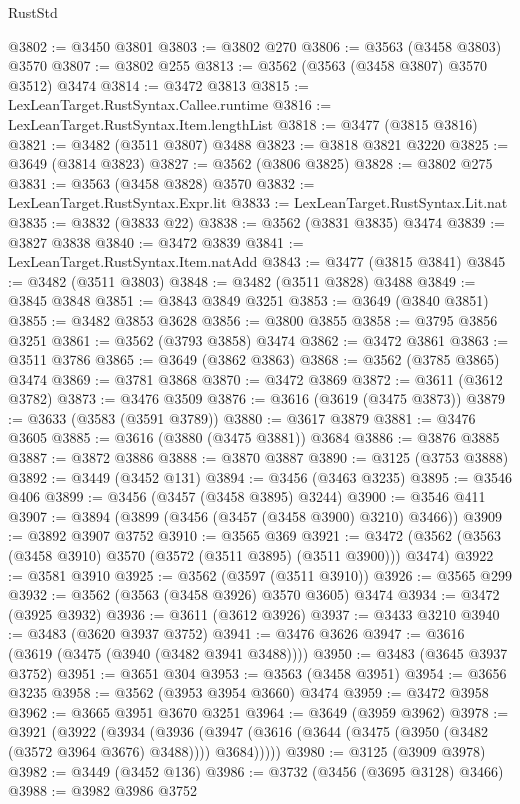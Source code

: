 \begin{lexlean}{RustStd}
\begin{coremodule}
@3802 := @3450 @3801
@3803 := @3802 @270
@3806 := @3563 (@3458 @3803) @3570
@3807 := @3802 @255
@3813 := @3562 (@3563 (@3458 @3807) @3570 @3512) @3474
@3814 := @3472 @3813
@3815 := LexLeanTarget.RustSyntax.Callee.runtime
@3816 := LexLeanTarget.RustSyntax.Item.lengthList
@3818 := @3477 (@3815 @3816)
@3821 := @3482 (@3511 @3807) @3488
@3823 := @3818 @3821 @3220
@3825 := @3649 (@3814 @3823)
@3827 := @3562 (@3806 @3825)
@3828 := @3802 @275
@3831 := @3563 (@3458 @3828) @3570
@3832 := LexLeanTarget.RustSyntax.Expr.lit
@3833 := LexLeanTarget.RustSyntax.Lit.nat
@3835 := @3832 (@3833 @22)
@3838 := @3562 (@3831 @3835) @3474
@3839 := @3827 @3838
@3840 := @3472 @3839
@3841 := LexLeanTarget.RustSyntax.Item.natAdd
@3843 := @3477 (@3815 @3841)
@3845 := @3482 (@3511 @3803)
@3848 := @3482 (@3511 @3828) @3488
@3849 := @3845 @3848
@3851 := @3843 @3849 @3251
@3853 := @3649 (@3840 @3851)
@3855 := @3482 @3853 @3628
@3856 := @3800 @3855
@3858 := @3795 @3856 @3251
@3861 := @3562 (@3793 @3858) @3474
@3862 := @3472 @3861
@3863 := @3511 @3786
@3865 := @3649 (@3862 @3863)
@3868 := @3562 (@3785 @3865) @3474
@3869 := @3781 @3868
@3870 := @3472 @3869
@3872 := @3611 (@3612 @3782)
@3873 := @3476 @3509
@3876 := @3616 (@3619 (@3475 @3873))
@3879 := @3633 (@3583 (@3591 @3789))
@3880 := @3617 @3879
@3881 := @3476 @3605
@3885 := @3616 (@3880 (@3475 @3881)) @3684
@3886 := @3876 @3885
@3887 := @3872 @3886
@3888 := @3870 @3887
@3890 := @3125 (@3753 @3888)
@3892 := @3449 (@3452 @131)
@3894 := @3456 (@3463 @3235)
@3895 := @3546 @406
@3899 := @3456 (@3457 (@3458 @3895) @3244)
@3900 := @3546 @411
@3907 := @3894 (@3899 (@3456 (@3457 (@3458 @3900) @3210) @3466))
@3909 := @3892 @3907 @3752
@3910 := @3565 @369
@3921 := @3472 (@3562 (@3563 (@3458 @3910) @3570 (@3572 (@3511 @3895) (@3511 @3900))) @3474)
@3922 := @3581 @3910
@3925 := @3562 (@3597 (@3511 @3910))
@3926 := @3565 @299
@3932 := @3562 (@3563 (@3458 @3926) @3570 @3605) @3474
@3934 := @3472 (@3925 @3932)
@3936 := @3611 (@3612 @3926)
@3937 := @3433 @3210
@3940 := @3483 (@3620 @3937 @3752)
@3941 := @3476 @3626
@3947 := @3616 (@3619 (@3475 (@3940 (@3482 @3941 @3488))))
@3950 := @3483 (@3645 @3937 @3752)
@3951 := @3651 @304
@3953 := @3563 (@3458 @3951)
@3954 := @3656 @3235
@3958 := @3562 (@3953 @3954 @3660) @3474
@3959 := @3472 @3958
@3962 := @3665 @3951 @3670 @3251
@3964 := @3649 (@3959 @3962)
@3978 := @3921
    (@3922
      (@3934
        (@3936 (@3947 (@3616 (@3644 (@3475 (@3950 (@3482 (@3572 @3964 @3676) @3488)))) @3684)))))
@3980 := @3125 (@3909 @3978)
@3982 := @3449 (@3452 @136)
@3986 := @3732 (@3456 (@3695 @3128) @3466)
@3988 := @3982 @3986 @3752

\end{coremodule}
\end{lexlean}
